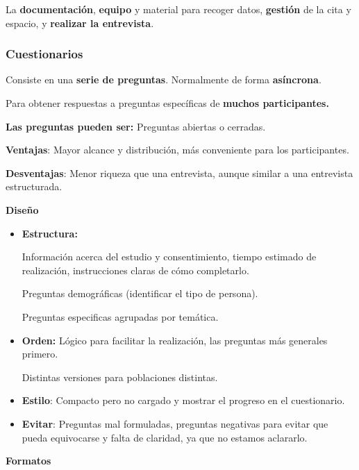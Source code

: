 \documentclass[12pt]{report} %
\begin{document}
La \textbf{documentación}, \textbf{equipo} y material para recoger
datos, \textbf{gestión} de la cita y espacio, y \textbf{realizar la
entrevista}.

\hypertarget{cuestionarios-1}{%
\subsubsection{Cuestionarios}\label{cuestionarios-1}}

Consiste en una \textbf{serie de preguntas}. Normalmente de forma
\textbf{asíncrona}.

Para obtener respuestas a preguntas específicas de \textbf{muchos
participantes.}

\textbf{Las preguntas pueden ser:} Preguntas abiertas o cerradas.

\textbf{Ventajas}: Mayor alcance y distribución, más conveniente para
los participantes.

\textbf{Desventajas}: Menor riqueza que una entrevista, aunque similar a
una entrevista estructurada.

\textbf{Diseño}

\begin{itemize}
\item
  \textbf{Estructura:}

  Información acerca del estudio y consentimiento, tiempo estimado de
  realización, instrucciones claras de cómo completarlo.

  Preguntas demográficas (identificar el tipo de persona).

  Preguntas especificas agrupadas por temática.
\item
  \textbf{Orden:} Lógico para facilitar la realización, las preguntas
  más generales primero.

  Distintas versiones para poblaciones distintas.
\item
  \textbf{Estilo}: Compacto pero no cargado y mostrar el progreso en el
  cuestionario.
\item
  \textbf{Evitar}: Preguntas mal formuladas, preguntas negativas para
  evitar que pueda equivocarse y falta de claridad, ya que no estamos
  aclararlo.
\end{itemize}

\textbf{Formatos}
\end{document}
